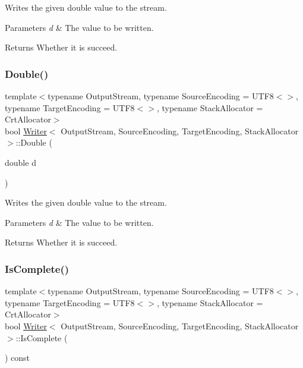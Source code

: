 Writes the given {\ttfamily double} value to the stream. 


\begin{DoxyParams}{Parameters}
{\em d} & The value to be written. \\
\hline
\end{DoxyParams}
\begin{DoxyReturn}{Returns}
Whether it is succeed. 
\end{DoxyReturn}
\mbox{\label{classWriter_ae80dc830a4f1d84e6eaf6b182c0ceccb}} 
\subsubsection{\texorpdfstring{Double()}{Double()}\hspace{0.1cm}{\footnotesize\ttfamily [2/2]}}
{\footnotesize\ttfamily template$<$typename Output\+Stream, typename Source\+Encoding = U\+T\+F8$<$$>$, typename Target\+Encoding = U\+T\+F8$<$$>$, typename Stack\+Allocator = Crt\+Allocator$>$ \\
bool \hyperlink{classWriter}{Writer}$<$ Output\+Stream, Source\+Encoding, Target\+Encoding, Stack\+Allocator $>$\+::Double (\begin{DoxyParamCaption}\item[{double}]{d }\end{DoxyParamCaption})\hspace{0.3cm}{\ttfamily [inline]}}



Writes the given {\ttfamily double} value to the stream. 


\begin{DoxyParams}{Parameters}
{\em d} & The value to be written. \\
\hline
\end{DoxyParams}
\begin{DoxyReturn}{Returns}
Whether it is succeed. 
\end{DoxyReturn}
\mbox{\label{classWriter_a3afe8548b06b9f9601f59fbc0687c79b}} 
\subsubsection{\texorpdfstring{Is\+Complete()}{IsComplete()}\hspace{0.1cm}{\footnotesize\ttfamily [1/2]}}
{\footnotesize\ttfamily template$<$typename Output\+Stream, typename Source\+Encoding = U\+T\+F8$<$$>$, typename Target\+Encoding = U\+T\+F8$<$$>$, typename Stack\+Allocator = Crt\+Allocator$>$ \\
bool \hyperlink{classWriter}{Writer}$<$ Output\+Stream, Source\+Encoding, Target\+Encoding, Stack\+Allocator $>$\+::Is\+Complete (\begin{DoxyParamCaption}{ }\end{DoxyParamCaption}) const\hspace{0.3cm}{\ttfamily [inline]}}



